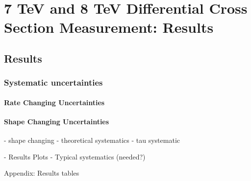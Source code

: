 \chapter{7 TeV and 8 TeV Differential Cross Section Measurement: Results}
\label{c:Differential_Cross_Section:results}

\section{Results}
\label{s:results}

\subsection{Systematic uncertainties}
\label{ss:systematic_uncertainties}

\subsubsection{Rate Changing Uncertainties}
\label{sss:rate_changing_uncertainties}

\subsubsection{Shape Changing Uncertainties}
\label{sss:shape_changing_uncertainties}

			- shape changing
			- theoretical systematics
			- tau systematic
			
	- Results Plots
	- Typical systematics (needed?)
	
	
Appendix:
Results tables